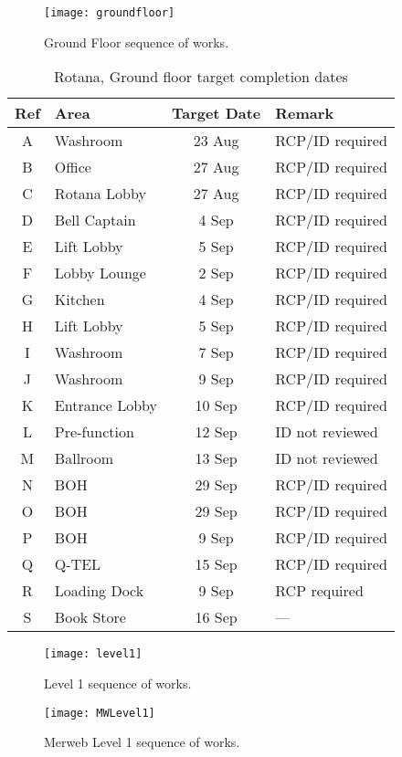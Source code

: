 \begin{figure*}[htbp]
 \texttt{[image: groundfloor]}
  \caption{Ground Floor sequence of works.}
  \label{fig:GRsequence}
\end{figure*}
\newcommand{\rcp}{RCP/ID required }
\begin{table}[htbp]
\begin{center}
\begin{tabular}{clcl}
\toprule
Ref &Area  & Target Date & Remark\\
\midrule
A       &Washroom & 23 Aug &\rcp  \\
B       &Office & 27 Aug  &\rcp\\
C      & Rotana Lobby & 27 Aug &\rcp\\
D      & Bell Captain & 4 Sep &\rcp\\
E      &Lift Lobby & 5 Sep &\rcp\\
F      &Lobby Lounge & 2 Sep & \rcp  \\
G     & Kitchen  & 4 Sep &\rcp\\
H     &Lift Lobby& 5 Sep &\rcp\\
I    &Washroom & 7 Sep &\rcp\\
J    &Washroom & 9 Sep &\rcp\\
K     &Entrance Lobby & 10 Sep&\rcp \\
L     &Pre-function &12 Sep &ID not reviewed\\
M    &Ballroom & 13 Sep &ID not reviewed\\
N &BOH &29 Sep &\rcp \\
O &BOH &29 Sep &\rcp \\
P &BOH  &9 Sep &\rcp \\
Q &Q-TEL  &15 Sep &\rcp \\
R &Loading Dock &9 Sep &RCP required\\
S &Book Store &16 Sep & --- \\
\bottomrule
\end{tabular}
\caption{Rotana,  Ground floor  target completion dates}
\end{center}
\end{table}




\begin{figure*}[htbp]
 \texttt{[image: level1]}
  \caption{Level 1 sequence of works.}
  \label{fig:level1}
\end{figure*}




%
\begin{figure*}[htbp]
 \texttt{[image: MWLevel1]}
  \caption{Merweb Level 1 sequence of works.}
  \label{fig:level7}
\end{figure*}


